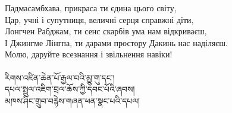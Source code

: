 \newpage
Падмасамбхава, прикраса ти єдина цього світу,\\
Цар, учні і супутниця, величні серця справжні діти,\\
Лонгчен Рабджам, ти сенс скарбів ума нам відкриваєш,\\
І Джингме Лінгпа, ти дарами простору Дакинь нас наділяєш.\\
Молю, даруйте всезнання і звільнення навіки!\\
\\
\ti
རིགས་འཛིན་ཆེན་པོ་རྒྱལ་བའི་མྱུ་གུ་དང་།\\
དཔལ་སྤྲུལ་འཇིག་བྲལ་ཆོས་ཀྱི་དབང་པོའི་ཞབས།\\
མཁས་ཤིང་གྲུབ་བརྙེས་གཞན་ཕན་སྣང་པའི་དཔལ།\\
